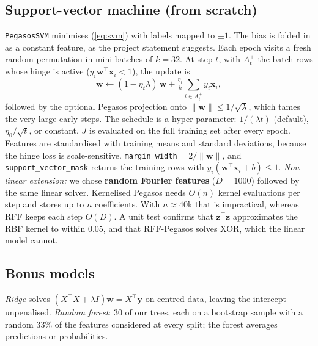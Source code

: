 \documentclass[10pt,twocolumn,a4paper]{article}
\begin{document}
\subsection{Support-vector machine (from scratch)}
\texttt{PegasosSVM} minimises (\ref{eq:svm}) with labels mapped to
$\pm1$. The bias is folded in as a constant feature, as the project
statement suggests. Each epoch visits a fresh random permutation in
mini-batches of $k=32$. At step $t$, with $A_t^+$ the batch rows whose
hinge is active ($y_i\mathbf w^\top\mathbf x_i<1$), the update is
\begin{equation}
  \mathbf w\leftarrow(1-\eta_t\lambda)\,\mathbf w+\tfrac{\eta_t}{k}\textstyle\sum_{i\in A_t^+}y_i\mathbf x_i,
\end{equation}
followed by the optional Pegasos projection onto
$\lVert\mathbf w\rVert\le1/\sqrt\lambda$, which tames the very large early
steps. The schedule is a hyper-parameter: $1/(\lambda t)$ (default),
$\eta_0/\sqrt t$, or constant. $J$ is evaluated on the full training set
after every epoch. Features are standardised with training means and
standard deviations, because the hinge loss is scale-sensitive.
\texttt{margin\_width}${}=2/\lVert\mathbf w\rVert$, and
\texttt{support\_vector\_mask} returns the training rows with
$y_i(\mathbf w^\top\mathbf x_i+b)\le1$.
\emph{Non-linear extension:} we chose \textbf{random Fourier features}
($D=1000$) followed by the same linear solver. Kernelised Pegasos needs
$O(n)$ kernel evaluations per step and stores up to $n$ coefficients. With
$n\approx40$k that is impractical, whereas RFF keeps each step $O(D)$. A
unit test confirms that $\mathbf z^\top\mathbf z$ approximates the RBF
kernel to within 0.05, and that RFF-Pegasos solves XOR, which the linear
model cannot.

\subsection{Bonus models}
\emph{Ridge} solves $(X^\top X+\lambda I)\mathbf w=X^\top\mathbf y$ on
centred data, leaving the intercept unpenalised. \emph{Random forest}:
30 of our trees, each on a bootstrap sample with a random 33\% of the
features considered at every split; the forest averages predictions or
probabilities.
\end{document}
